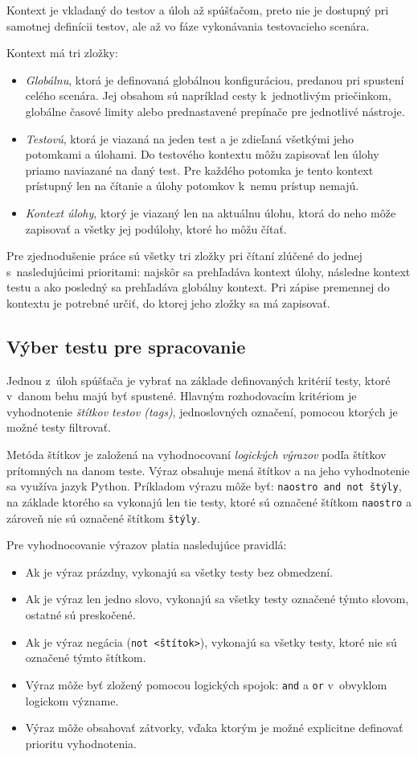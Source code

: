 \documentclass[
  digital, %
  oneside, %
  table,   %
  lof,     %
  lot,   %
]{fithesis3}
\begin{document}
Kontext je vkladaný do testov a úloh až spúšťačom, preto nie je dostupný pri samotnej definícii testov, ale až vo fáze vykonávania testovacieho scenára.

Kontext má tri zložky:
\begin{itemize}
    \item \emph{Globálnu}, ktorá je definovaná globálnou konfiguráciou, predanou pri spustení celého scenára. Jej obsahom sú napríklad cesty k~jednotlivým priečinkom, globálne časové limity alebo prednastavené prepínače pre jednotlivé nástroje. 
    \item \emph{Testovú}, ktorá je viazaná na jeden test a je zdieľaná všetkými jeho potomkami a úlohami. Do testového kontextu môžu zapisovať len úlohy priamo naviazané na daný test. Pre každého potomka je tento kontext prístupný len na čítanie a úlohy potomkov k~nemu prístup nemajú.
    \item \emph{Kontext úlohy}, ktorý je viazaný len na aktuálnu úlohu, ktorá do neho môže zapisovať a všetky jej podúlohy, ktoré ho môžu čítať.
\end{itemize}

Pre zjednodušenie práce sú všetky tri zložky pri čítaní zlúčené do jednej s~nasledujúcimi prioritami: najskôr sa prehľadáva kontext úlohy, následne kontext testu a ako posledný sa prehľadáva globálny kontext. Pri zápise premennej do kontextu je potrebné určiť, do ktorej jeho zložky sa má zapisovať. 

\subsection{Výber testu pre spracovanie}

Jednou z~úloh spúšťača je vybrať na základe definovaných kritérií testy, ktoré v~danom behu majú byť spustené. Hlavným rozhodovacím kritériom je vyhodnotenie \emph{štítkov testov (tags)}, jednoslovných označení, pomocou ktorých je možné testy filtrovať.

Metóda štítkov je založená na vyhodnocovaní \emph{logických výrazov} podľa štítkov prítomných na danom teste. Výraz obsahuje mená štítkov a na jeho vyhodnotenie sa využíva jazyk Python. Príkladom výrazu môže byť: \texttt{naostro and not štýly}, na základe ktorého sa vykonajú len tie testy, ktoré sú označené štítkom \texttt{naostro} a zároveň nie sú označené štítkom \texttt{štýly}. 

Pre vyhodnocovanie výrazov platia nasledujúce pravidlá:
\begin{itemize}
    \item Ak je výraz prázdny, vykonajú sa všetky testy bez obmedzení.
    \item Ak je výraz len jedno slovo, vykonajú sa všetky testy označené týmto slovom, ostatné sú preskočené.
    \item Ak je výraz negácia (\texttt{not <štítok>}), vykonajú sa všetky testy, ktoré nie sú označené týmto štítkom.
    \item Výraz môže byť zložený pomocou logických spojok: \texttt{and} a \texttt{or} v~obvyklom logickom význame.
    \item Výraz môže obsahovať zátvorky, vďaka ktorým je možné explicitne definovať prioritu vyhodnotenia. 
\end{itemize}
\end{document}
